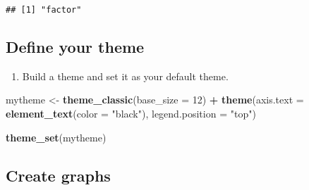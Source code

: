\documentclass[]{article}
\newenvironment{Shaded}{\begin{snugshade}}{\end{snugshade}}
\newcommand{\DataTypeTok}[1]{\textcolor[rgb]{0.13,0.29,0.53}{#1}}
\newcommand{\DecValTok}[1]{\textcolor[rgb]{0.00,0.00,0.81}{#1}}
\newcommand{\KeywordTok}[1]{\textcolor[rgb]{0.13,0.29,0.53}{\textbf{#1}}}
\newcommand{\NormalTok}[1]{#1}
\newcommand{\OperatorTok}[1]{\textcolor[rgb]{0.81,0.36,0.00}{\textbf{#1}}}
\newcommand{\StringTok}[1]{\textcolor[rgb]{0.31,0.60,0.02}{#1}}
\providecommand{\tightlist}{%
  \setlength{\itemsep}{0pt}\setlength{\parskip}{0pt}}
\begin{document}
\begin{verbatim}
## [1] "factor"
\end{verbatim}

\begin{Shaded}
\end{Shaded}

\hypertarget{define-your-theme}{%
\subsection{Define your theme}\label{define-your-theme}}

\begin{enumerate}
\def\labelenumi{\arabic{enumi}.}
\setcounter{enumi}{2}
\tightlist
\item
  Build a theme and set it as your default theme.
\end{enumerate}

\begin{Shaded}
\begin{Highlighting}[]
\NormalTok{mytheme <-}\StringTok{ }\KeywordTok{theme_classic}\NormalTok{(}\DataTypeTok{base_size =} \DecValTok{12}\NormalTok{) }\OperatorTok{+}
\StringTok{  }\KeywordTok{theme}\NormalTok{(}\DataTypeTok{axis.text =} \KeywordTok{element_text}\NormalTok{(}\DataTypeTok{color =} \StringTok{"black"}\NormalTok{), }
        \DataTypeTok{legend.position =} \StringTok{"top"}\NormalTok{)}

\KeywordTok{theme_set}\NormalTok{(mytheme) }
\end{Highlighting}
\end{Shaded}

\hypertarget{create-graphs}{%
\subsection{Create graphs}\label{create-graphs}}
\end{document}
